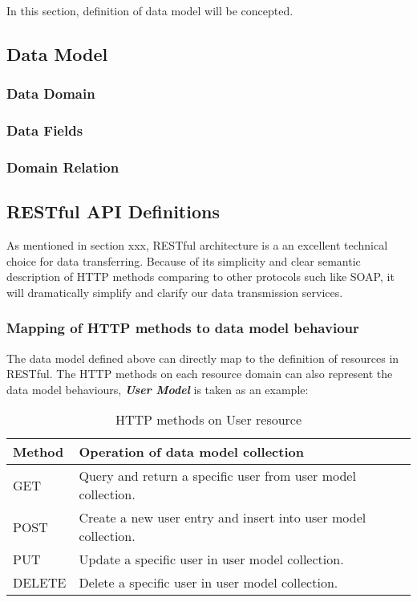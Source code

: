 

In this section, definition of data model will be concepted. 


\subsection{Data Model}


\subsubsection{ Data Domain }
\subsubsection{ Data Fields }
\subsubsection{ Domain Relation }




\subsection{RESTful API Definitions}

As mentioned in section xxx, RESTful architecture is a an excellent technical choice for data transferring. Because of its simplicity and clear semantic description of HTTP methods comparing to other protocols such like SOAP, it will dramatically simplify and clarify our data transmission services. 

\subsubsection{ Mapping of HTTP methods to data model behaviour }
The data model defined above can directly map to the definition of resources in RESTful. The HTTP methods on each resource domain can also represent the data model behaviours, \textbf{\textit{User Model}} is taken as an example: 
\begin{table}[!htbp]
\centering
\begin{tabularx}{\textwidth}{@{}lX@{}}
\toprule
Method        & {Operation of data model collection }                            \\ \midrule
GET           & {Query and return a specific user from user model collection.}   \\
POST          & {Create a new user entry and insert into user model collection.} \\
PUT           & {Update a specific user in user model collection.}               \\
DELETE        & {Delete a specific user in user model collection.}               \\ \bottomrule
\end{tabularx}
\caption{HTTP methods on User resource}
\label{http-method-on-user-resource}
\end{table}

